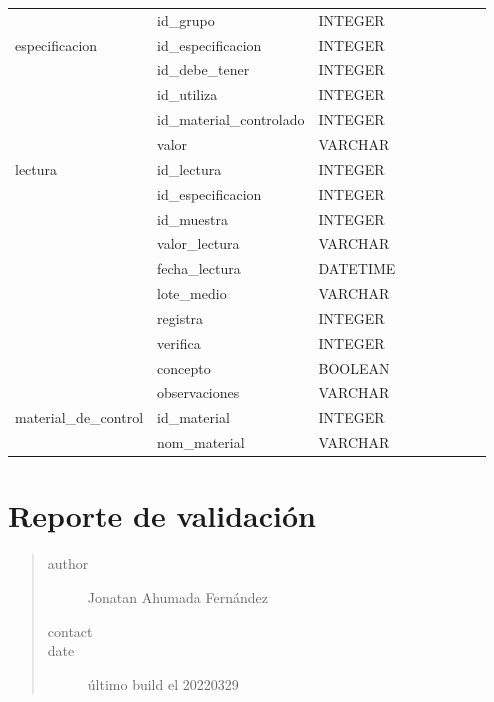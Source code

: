 \documentclass[letterpaper,10pt,spanish]{sphinxmanual}
\begin{document}
\begin{savenotes}
\begin{longtable}[c]{|l|l|l|l|l|l|l|l|l|}
&&&&&&\\
\hline&
id\_grupo
&
INTEGER
&&&&&&\\
\hline
especificacion
&
id\_especificacion
&
INTEGER
&&&&&&\\
\hline&
id\_debe\_tener
&
INTEGER
&&&&&&\\
\hline&
id\_utiliza
&
INTEGER
&&&&&&\\
\hline&
id\_material\_controlado
&
INTEGER
&&&&&&\\
\hline&
valor
&
VARCHAR
&&&&&&\\
\hline
lectura
&
id\_lectura
&
INTEGER
&&&&&&\\
\hline&
id\_especificacion
&
INTEGER
&&&&&&\\
\hline&
id\_muestra
&
INTEGER
&&&&&&\\
\hline&
valor\_lectura
&
VARCHAR
&&&&&&\\
\hline&
fecha\_lectura
&
DATETIME
&&&&&&\\
\hline&
lote\_medio
&
VARCHAR
&&&&&&\\
\hline&
registra
&
INTEGER
&&&&&&\\
\hline&
verifica
&
INTEGER
&&&&&&\\
\hline&
concepto
&
BOOLEAN
&&&&&&\\
\hline&
observaciones
&
VARCHAR
&&&&&&\\
\hline
material\_de\_control
&
id\_material
&
INTEGER
&&&&&&\\
\hline&
nom\_material
&
VARCHAR
&&&&&&\\
\hline
\end{longtable}\sphinxatlongtableend\end{savenotes}


\chapter{Reporte  de validación}
\label{\detokenize{requerimientos/resumen_validacion:reporte-de-validacion}}\label{\detokenize{requerimientos/resumen_validacion::doc}}\begin{quote}\begin{description}
\item[{author}] \leavevmode
Jonatan Ahumada Fernández

\item[{contact}] \leavevmode
{}

\item[{date}] \leavevmode
último build el 2022\sphinxhyphen{}03\sphinxhyphen{}29

\end{description}\end{quote}
\end{document}
